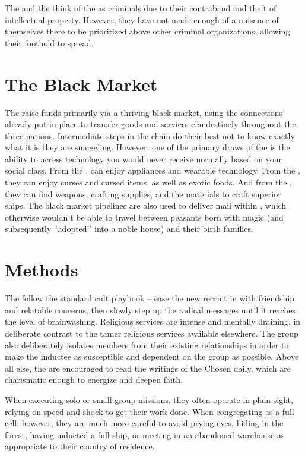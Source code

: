 \documentclass[blue]{GL2020}
\begin{document}
The \pTech{} and the \pFarm{} think of the \pGoaties{} as criminals due to their contraband and theft of intellectual property. However, they have not made enough of a nuisance of themselves there to be prioritized above other criminal organizations, allowing their foothold to spread.

\section*{The Black Market}
The \pGoaties{} raise funds primarily via a thriving black market, using the connections already put in place to transfer goods and services clandestinely throughout the three nations. Intermediate steps in the chain do their best not to know exactly what it is they are smuggling. However, one of the primary draws of the \pGoaties{} is the ability to access technology you would never receive normally based on your social class. From the \pTech{}, \pGoaties{} can enjoy appliances and wearable technology. From the \pFarm{}, they can enjoy curses and cursed items, as well as exotic foods. And from the \pShip{}, they can find weapons, crafting supplies, and the materials to craft superior ships. The black market pipelines are also used to deliver mail within \pFarm{}, which otherwise wouldn't be able to travel between peasants born with magic (and subsequently ``adopted’’ into a noble house) and their birth families.

\section*{Methods}
The \pGoaties{} follow the standard cult playbook -- ease the new recruit in with friendship and relatable concerns, then slowly step up the radical messages until it reaches the level of brainwashing. Religious services are intense and mentally draining, in deliberate contrast to the tamer religious services available elsewhere. The group also deliberately isolates members from their existing relationships in order to make the inductee as susceptible and dependent on the group as possible. Above all else, the \pGoaties{} are encouraged to read the writings of the Chosen daily, which are charismatic enough to energize and deepen faith.

When executing solo or small group missions, they often operate in plain sight, relying on speed and shock to get their work done. When congregating as a full cell, however, they are much more careful to avoid prying eyes, hiding in the forest, having inducted a full ship, or meeting in an abandoned warehouse as appropriate to their country of residence.
\end{document}

